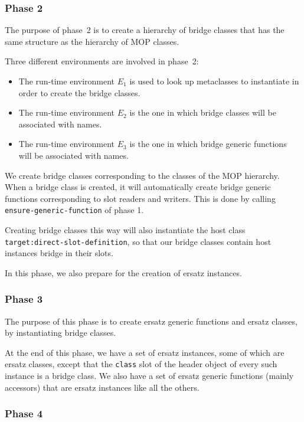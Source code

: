 \subsubsection{Phase 2}

The purpose of phase~2 is to create a hierarchy of bridge classes that
has the same structure as the hierarchy of MOP classes.

Three different environments are involved in phase~2:

\begin{itemize}
\item The run-time environment $E_1$ is used to look up metaclasses to
  instantiate in order to create the bridge classes.
\item The run-time environment $E_2$ is the one in which bridge
  classes will be associated with names.
\item The run-time environment $E_3$ is the one in which bridge
  generic functions will be associated with names.
\end{itemize}

We create bridge classes corresponding to the classes of the MOP
hierarchy.  When a bridge class is created, it will automatically
create bridge generic functions corresponding to slot readers and
writers.  This is done by calling \texttt{ensure-generic-function} of
phase 1.

Creating bridge classes this way will also instantiate the host class
\texttt{target:direct-slot-definition}, so that our bridge classes
contain host instances bridge in their slots. 

In this phase, we also prepare for the creation of ersatz instances.

\subsubsection{Phase 3}

The purpose of this phase is to create ersatz generic functions and
ersatz classes, by instantiating bridge classes.  

At the end of this phase, we have a set of ersatz instances, some of
which are ersatz classes, except that the \texttt{class} slot of the
header object of every such instance is a bridge class.  We also have
a set of ersatz generic functions (mainly accessors) that are ersatz
instances like all the others. 

\subsubsection{Phase 4}

